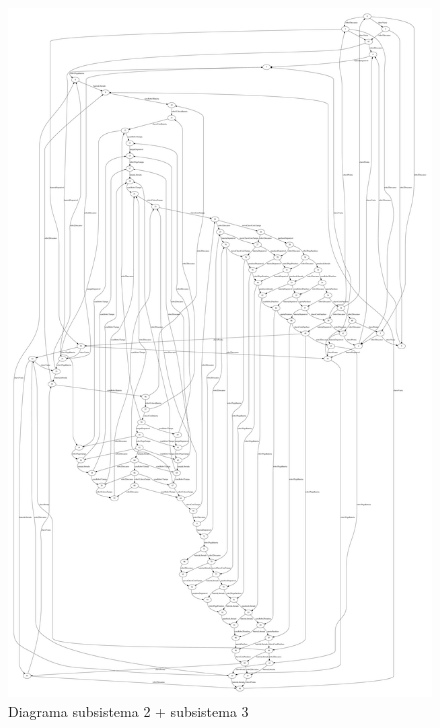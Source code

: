 \documentclass[a4paper,11pt,twocolumns]{article}
\begin{document}
\newpage
\begin{figure}[H]
    \centering
    \includegraphics[height = 0.95\textheight]{./img/g_sistema23.pdf}
    \caption{Diagrama subsistema 2 + subsistema 3}
    \label{fig:g_subsis23}
\end{figure}
\end{document}
